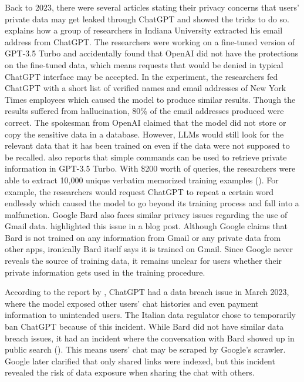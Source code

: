 Back to 2023, there were several articles stating their privacy concerns that users' private data may get leaked through ChatGPT and showed the tricks to do so. \cite{NYT2023ChatGPTPrivacyExploit} explains how a group of researchers in Indiana University extracted his email address from ChatGPT. The researchers were working on a fine-tuned version of GPT-3.5 Turbo and accidentally found that OpenAI did not have the protections on the fine-tuned data, which means requests that would be denied in typical ChatGPT interface may be accepted. In the experiment, the researchers fed ChatGPT with a short list of verified names and email addresses of New York Times employees which caused the model to produce similar results. Though the results suffered from hallucination, 80\% of the email addresses produced were correct. The spokesman from OpenAI claimed that the model did not store or copy the sensitive data in a database. However, LLMs would still look for the relevant data that it has been trained on even if the data were not supposed to be recalled. \cite{Grad2023} also reports that simple commands can be used to retrieve private information in GPT-3.5 Turbo. With \$200 worth of queries, the researchers were able to extract 10,000 unique verbatim memorized training examples (\cite{Nasr2023}). For example, the researchers would request ChatGPT to repeat a certain word endlessly which caused the model to go beyond its training process and fall into a malfunction. Google Bard also faces similar privacy issues regarding the use of Gmail data. \cite{Hanna2023} highlighted this issue in a blog post. Although Google claims that Bard is not trained on any information from Gmail or any private data from other apps, ironically Bard itself says it is trained on Gmail. Since Google never reveals the source of training data, it remains unclear for users whether their private information gets used in the training procedure.

According to the report by \cite{Pietro2023}, ChatGPT had a data breach issue in March 2023, where the model exposed other users' chat histories and even payment information to unintended users. The Italian data regulator chose to temporarily ban ChatGPT because of this incident. While Bard did not have similar data breach issues, it had an incident where the conversation with Bard showed up in public search (\cite{Pieter2023}). This means users' chat may be scraped by Google's scrawler. Google later clarified that only shared links were indexed, but this incident revealed the risk of data exposure when sharing the chat with others.

